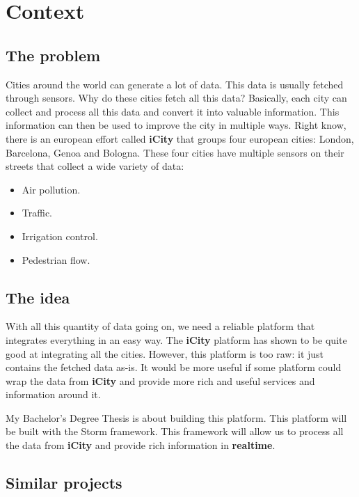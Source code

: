 \documentclass[a4paper,12pt]{article}
\newcommand{\mylist}{
\begin{itemize}
\setlength{\itemsep}{1pt}
\setlength{\parskip}{0pt}
\setlength{\parsep}{0pt}}
\newcommand{\mylistend}{\end{itemize}}
\begin{document}


\thispagestyle{empty}
\tableofcontents{\newpage}

\setcounter{page}{1}

\section{Context}

\subsection{The problem}

Cities around the world can generate a lot of data. This data is usually
fetched through sensors. Why do these cities fetch all this data? Basically,
each city can collect and process all this data and convert it into valuable
information. This information can then be used to improve the city in multiple
ways. Right know, there is an european effort called {\bf iCity} that groups
four european cities: London, Barcelona, Genoa and Bologna. These four cities
have multiple sensors on their streets that collect a wide variety of data:

\mylist
  \item Air pollution.
  \item Traffic.
  \item Irrigation control.
  \item Pedestrian flow.
\mylistend

\subsection{The idea}

With all this quantity of data going on, we need a reliable platform that
integrates everything in an easy way. The {\bf iCity} platform has shown to be
quite good at integrating all the cities. However, this platform is too raw: it
just contains the fetched data as-is. It would be more useful if some platform
could wrap the data from {\bf iCity} and provide more rich and useful services
and information around it.

My Bachelor's Degree Thesis is about building this platform. This platform will
be built with the Storm framework. This framework will allow us to process all
the data from {\bf iCity} and provide rich information in {\bf realtime}.

\subsection{Similar projects}
\end{document}
